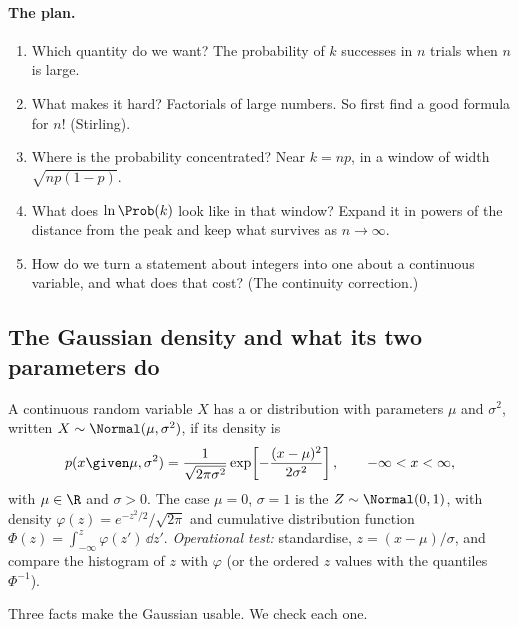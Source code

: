 \paragraph{The plan.}
\begin{enumerate}[label=\arabic*.]
  \item Which quantity do we want? The probability of $k$ successes in $n$ trials when $n$ is large.
  \item What makes it hard? Factorials of large numbers. So first find a good formula for $n!$ (Stirling).
  \item Where is the probability concentrated? Near $k=np$, in a window of width $\sqrt{np(1-p)}$.
  \item What does $\ln\Prob(k)$ look like in that window? Expand it in powers of the distance from the peak and keep what survives as $n\to\infty$.
  \item How do we turn a statement about integers into one about a continuous variable, and what does that cost? (The continuity correction.)
\end{enumerate}

\subsection{The Gaussian density and what its two parameters do}
\label{2b:sec:gauss-def}

\begin{workdef}
A continuous random variable $X$ has a  or  distribution with parameters $\mu$ and $\sigma^2$, written $X\sim\Normal(\mu,\sigma^2)$, if its density  is
\begin{equation}
  p(x\given\mu,\sigma^2)=\frac{1}{\sqrt{2\pi\sigma^2}}\exp\!\left[-\frac{(x-\mu)^2}{2\sigma^2}\right],\qquad -\infty<x<\infty ,
  \label{2b:eq:gauss}
\end{equation}
with $\mu\in\R$ and $\sigma>0$. The case $\mu=0$, $\sigma=1$ is the  $Z\sim\Normal(0,1)$, with density $\varphi(z)=e^{-z^2/2}/\sqrt{2\pi}$ and cumulative distribution function  $\Phi(z)=\int_{-\infty}^z\varphi(z')\,\dd z'$.
\emph{Operational test:} standardise, $z=(x-\mu)/\sigma$, and compare the histogram of $z$ with $\varphi$ (or the ordered $z$ values with the quantiles $\Phi^{-1}$).
\end{workdef}

Three facts make the Gaussian usable. We check each one.

